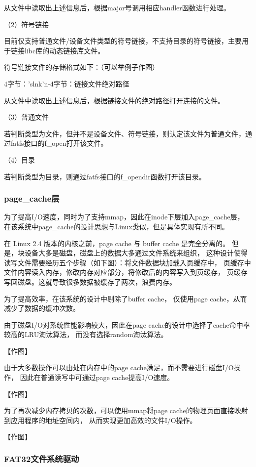 \documentclass[UTF8,a4paper,10pt]{ctexart}
\begin{document}
从文件中读取出上述信息后，根据major号调用相应handler函数进行处理。

（2）符号链接

目前仅支持普通文件/设备文件类型的符号链接，不支持目录的符号链接，主要用于链接libc库的动态链接库文件。

符号链接文件的存储格式如下：（可以举例子作图）

{4字节：'slnk'}{n-4字节：链接文件绝对路径}

从文件中读取出上述信息后，根据链接文件的绝对路径打开连接的文件。

（3）普通文件

若判断类型为文件，但并不是设备文件、符号链接，则认定该文件为普通文件，通过fatfs接口的f\_open打开该文件。

（4）目录

若判断类型为目录，则通过fatfs接口的f\_opendir函数打开该目录。

\subsubsection{page\_cache层}

为了提高I/O速度，同时为了支持mmap，因此在inode下层加入page\_cache层，
在该系统中page\_cache的设计思想与Linux类似，但是具体实现有所不同。

在 Linux 2.4 版本的内核之前，page cache 与 buffer cache 是完全分离的。
但是，块设备大多是磁盘，磁盘上的数据大多通过文件系统来组织，
这种设计使得读写文件需要经历五个步骤（如下图）：将文件数据块加载入页缓存中，
页缓存中文件内容读入内存，修改内存对应部分，将修改后的内容写入到页缓存，
页缓存写回磁盘。这就导致很多数据被缓存了两次，浪费内存。

为了提高效率，在该系统的设计中剔除了buffer cache，
仅使用page cache，从而减少了数据的缓冲次数。

由于磁盘I/O对系统性能影响较大，因此在page cache的设计中选择了cache命中率较高的LRU淘汰算法，
而没有选择random淘汰算法。

【作图】

由于大多数操作可以由处在内存中的page cache满足，而不需要进行磁盘I/O操作，
因此在普通读写中可通过page cache提高I/O速度。

【作图】

为了再次减少内存拷贝的次数，可以使用mmap将page cache的物理页面直接映射到应用程序的地址空间内，
从而实现更加高效的文件I/O操作。

【作图】

\subsubsection{FAT32文件系统驱动}
\end{document}

